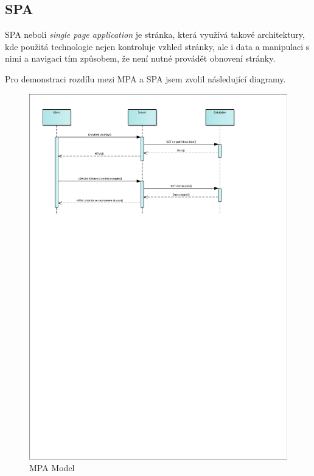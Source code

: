 \subsection{SPA}
SPA neboli \emph{single page application} je stránka, která využívá takové architektury, kde použitá technologie nejen kontroluje
vzhled stránky, ale i data a manipulaci s nimi a navigaci tím způsobem, že není nutné provádět obnovení stránky.\cite{VueSPA}

Pro demonstraci rozdílu mezi MPA a SPA jsem zvolil následující diagramy.

\begin{figure}[H]
    \includegraphics[width=\textwidth]{pdf/MPA-model}
    \caption{MPA Model} \label{picture:recipeo:mpa-model}
\end{figure}
